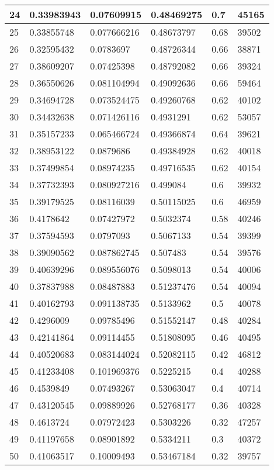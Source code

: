 \begin{longtable}{|l|l|l|l|l|l|}
24 & 0.33983943 & 0.07609915 & 0.48469275 & 0.7 & 45165 \\ \hline 
25 & 0.33855748 & 0.077666216 & 0.48673797 & 0.68 & 39502 \\ \hline 
26 & 0.32595432 & 0.0783697 & 0.48726344 & 0.66 & 38871 \\ \hline 
27 & 0.38609207 & 0.07425398 & 0.48792082 & 0.66 & 39324 \\ \hline 
28 & 0.36550626 & 0.081104994 & 0.49092636 & 0.66 & 59464 \\ \hline 
29 & 0.34694728 & 0.073524475 & 0.49260768 & 0.62 & 40102 \\ \hline 
30 & 0.34432638 & 0.071426116 & 0.4931291 & 0.62 & 53057 \\ \hline 
31 & 0.35157233 & 0.065466724 & 0.49366874 & 0.64 & 39621 \\ \hline 
32 & 0.38953122 & 0.0879686 & 0.49384928 & 0.62 & 40018 \\ \hline 
33 & 0.37499854 & 0.08974235 & 0.49716535 & 0.62 & 40154 \\ \hline 
34 & 0.37732393 & 0.080927216 & 0.499084 & 0.6 & 39932 \\ \hline 
35 & 0.39179525 & 0.08116039 & 0.50115025 & 0.6 & 46959 \\ \hline 
36 & 0.4178642 & 0.07427972 & 0.5032374 & 0.58 & 40246 \\ \hline 
37 & 0.37594593 & 0.0797093 & 0.5067133 & 0.54 & 39399 \\ \hline 
38 & 0.39090562 & 0.087862745 & 0.507483 & 0.54 & 39576 \\ \hline 
39 & 0.40639296 & 0.089556076 & 0.5098013 & 0.54 & 40006 \\ \hline 
40 & 0.37837988 & 0.08487883 & 0.51237476 & 0.54 & 40094 \\ \hline 
41 & 0.40162793 & 0.091138735 & 0.5133962 & 0.5 & 40078 \\ \hline 
42 & 0.4296009 & 0.09785496 & 0.51552147 & 0.48 & 40284 \\ \hline 
43 & 0.42141864 & 0.09114455 & 0.51808095 & 0.46 & 40495 \\ \hline 
44 & 0.40520683 & 0.083144024 & 0.52082115 & 0.42 & 46812 \\ \hline 
45 & 0.41233408 & 0.101969376 & 0.5225215 & 0.4 & 40288 \\ \hline 
46 & 0.4539849 & 0.07493267 & 0.53063047 & 0.4 & 40714 \\ \hline 
47 & 0.43120545 & 0.09889926 & 0.52768177 & 0.36 & 40328 \\ \hline 
48 & 0.4613724 & 0.07972423 & 0.5303226 & 0.32 & 47257 \\ \hline 
49 & 0.41197658 & 0.08901892 & 0.5334211 & 0.3 & 40372 \\ \hline 
50 & 0.41063517 & 0.10009493 & 0.53467184 & 0.32 & 39757 \\ \hline 
\end{longtable}